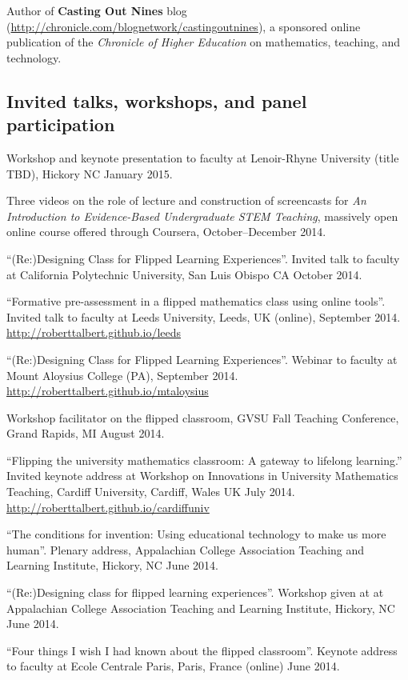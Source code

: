 \documentclass[letterpaper]{article}
\renewenvironment{itemize}{
  \begin{list}{}{
    \setlength{\leftmargin}{1.5em}
	\setlength{\itemsep}{0in}
  }
}{
  \end{list}
}
\begin{document}
Author of \textbf{Casting Out Nines} blog (\url{http://chronicle.com/blognetwork/castingoutnines}), a sponsored online publication of the \emph{Chronicle of Higher Education} on mathematics, teaching, and technology.


\subsection*{Invited talks, workshops, and panel participation}
\begin{itemize}
	\item Workshop and keynote presentation to faculty at Lenoir-Rhyne University (title TBD), Hickory NC January 2015. 
	\item Three videos on the role of lecture and construction of screencasts for \emph{An Introduction to Evidence-Based Undergraduate STEM Teaching}, massively open online course offered through Coursera, October--December 2014. 
	\item ``(Re:)Designing Class for Flipped Learning Experiences''. Invited talk to faculty at California Polytechnic University, San Luis Obispo CA October 2014. 
	\item ``Formative pre-assessment in a flipped mathematics class using online tools''. Invited talk to faculty at Leeds University, Leeds, UK (online), September 2014. \url{http://roberttalbert.github.io/leeds}
	\item ``(Re:)Designing Class for Flipped Learning Experiences''. Webinar to faculty at Mount Aloysius College (PA), September 2014. \url{http://roberttalbert.github.io/mtaloysius}
	\item Workshop facilitator on the flipped classroom, GVSU Fall Teaching Conference, Grand Rapids, MI August 2014. 
	\item ``Flipping the university mathematics classroom: A gateway to lifelong learning.'' Invited keynote address at Workshop on Innovations in University Mathematics Teaching, Cardiff University, Cardiff, Wales UK July 2014. \url{http://roberttalbert.github.io/cardiffuniv}
	\item ``The conditions for invention: Using educational technology to make us more human''. Plenary address, Appalachian College Association Teaching and Learning Institute, Hickory, NC June 2014.
	\item ``(Re:)Designing class for flipped learning experiences''.  Workshop given at at Appalachian College Association Teaching and Learning Institute, Hickory, NC June 2014. 
	\item ``Four things I wish I had known about the flipped classroom''. Keynote address to faculty at Ecole Centrale Paris, Paris, France (online) June 2014. 

\end{itemize}
\end{document}
